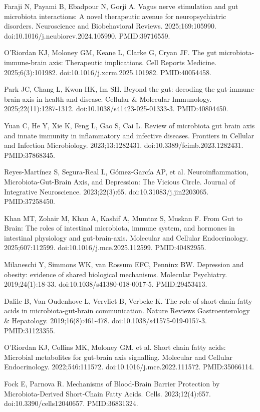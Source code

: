 \documentclass[12pt,oneside]{book}
\newcommand{\reff}[2]{\par\hangindent=7mm\hangafter=1\noindent[#1]\hspace{2mm}#2\par}
\begin{document}
\reff{10}{Faraji N, Payami B, Ebadpour N, Gorji A. Vagus nerve stimulation and gut microbiota interactions: A novel therapeutic avenue for neuropsychiatric disorders. Neuroscience and Biobehavioral Reviews. 2025;169:105990. doi:10.1016/j.neubiorev.2024.105990. PMID:39716559.}

\reff{11}{O'Riordan KJ, Moloney GM, Keane L, Clarke G, Cryan JF. The gut microbiota-immune-brain axis: Therapeutic implications. Cell Reports Medicine. 2025;6(3):101982. doi:10.1016/j.xcrm.2025.101982. PMID:40054458.}

\reff{12}{Park JC, Chang L, Kwon HK, Im SH. Beyond the gut: decoding the gut-immune-brain axis in health and disease. Cellular \& Molecular Immunology. 2025;22(11):1287-1312. doi:10.1038/s41423-025-01333-3. PMID:40804450.}

\reff{13}{Yuan C, He Y, Xie K, Feng L, Gao S, Cai L. Review of microbiota gut brain axis and innate immunity in inflammatory and infective diseases. Frontiers in Cellular and Infection Microbiology. 2023;13:1282431. doi:10.3389/fcimb.2023.1282431. PMID:37868345.}

\reff{14}{Reyes-Martínez S, Segura-Real L, Gómez-García AP, et al. Neuroinflammation, Microbiota-Gut-Brain Axis, and Depression: The Vicious Circle. Journal of Integrative Neuroscience. 2023;22(3):65. doi:10.31083/j.jin2203065. PMID:37258450.}

\reff{15}{Khan MT, Zohair M, Khan A, Kashif A, Mumtaz S, Muskan F. From Gut to Brain: The roles of intestinal microbiota, immune system, and hormones in intestinal physiology and gut-brain-axis. Molecular and Cellular Endocrinology. 2025;607:112599. doi:10.1016/j.mce.2025.112599. PMID:40482955.}

\reff{16}{Milaneschi Y, Simmons WK, van Rossum EFC, Penninx BW. Depression and obesity: evidence of shared biological mechanisms. Molecular Psychiatry. 2019;24(1):18-33. doi:10.1038/s41380-018-0017-5. PMID:29453413.}

\reff{17}{Dalile B, Van Oudenhove L, Vervliet B, Verbeke K. The role of short-chain fatty acids in microbiota-gut-brain communication. Nature Reviews Gastroenterology \& Hepatology. 2019;16(8):461-478. doi:10.1038/s41575-019-0157-3. PMID:31123355.}

\reff{18}{O'Riordan KJ, Collins MK, Moloney GM, et al. Short chain fatty acids: Microbial metabolites for gut-brain axis signalling. Molecular and Cellular Endocrinology. 2022;546:111572. doi:10.1016/j.mce.2022.111572. PMID:35066114.}

\reff{19}{Fock E, Parnova R. Mechanisms of Blood-Brain Barrier Protection by Microbiota-Derived Short-Chain Fatty Acids. Cells. 2023;12(4):657. doi:10.3390/cells12040657. PMID:36831324.}
\end{document}
